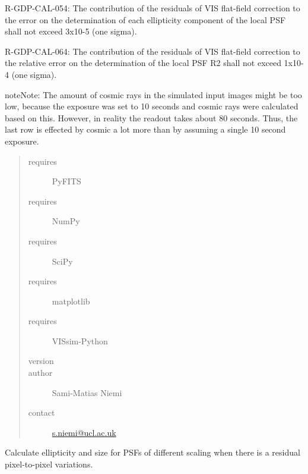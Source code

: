 \documentclass[a4paper,11pt,english]{sphinxmanual}
\begin{document}
R-GDP-CAL-054:
The contribution of the residuals of VIS flat-field correction to the error on the determination of each
ellipticity component of the local PSF shall not exceed 3x10-5 (one sigma).

R-GDP-CAL-064:
The contribution of the residuals of VIS flat-field correction to the relative error on the determination
of the local PSF R2 shall not exceed 1x10-4 (one sigma).

\begin{notice}{note}{Note:}
The amount of cosmic rays in the simulated input images might be too low, because the exposure was
set to 10 seconds and cosmic rays were calculated based on this. However, in reality the readout
takes about 80 seconds. Thus, the last row is effected by cosmic a lot more than by assuming a single
10 second exposure.
\end{notice}
\begin{quote}\begin{description}
\item[{requires}] \leavevmode
PyFITS

\item[{requires}] \leavevmode
NumPy

\item[{requires}] \leavevmode
SciPy

\item[{requires}] \leavevmode
matplotlib

\item[{requires}] \leavevmode
VISsim-Python

\item[{version}] 

\item[{author}] \leavevmode
Sami-Matias Niemi

\item[{contact}] \leavevmode
\href{mailto:s.niemi@ucl.ac.uk}{s.niemi@ucl.ac.uk}

\end{description}\end{quote}

\begin{fulllineitems}
\label{reduction:analysis.FlatfieldCalibration.findTolerableError}
Calculate ellipticity and size for PSFs of different scaling when there is a residual
pixel-to-pixel variations.

\end{fulllineitems}
\end{document}
